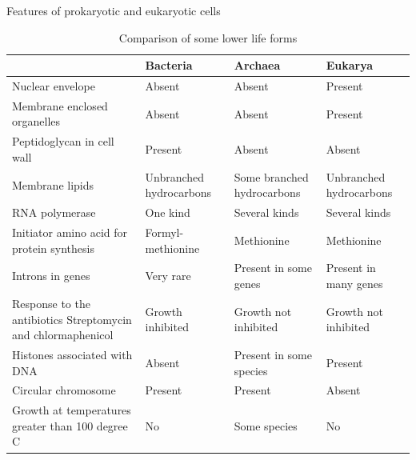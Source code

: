 \documentclass[ignorenonframetext,aspectratio=169]{beamer}
\begin{document}
\begin{frame}{Features of prokaryotic and eukaryotic cells}
\protect\hypertarget{features-of-prokaryotic-and-eukaryotic-cells-2}{}

\begin{table}[t]

\caption{\label{tab:eu-arch-prokaryotic-cell}Comparison of some lower life forms}
\centering
\fontsize{6}{8}\selectfont
\begin{tabular}{>{\raggedright\arraybackslash}p{15em}>{\raggedright\arraybackslash}p{15em}>{\raggedright\arraybackslash}p{15em}l}
\toprule
  & Bacteria & Archaea & Eukarya\\
\midrule
\rowcolor{gray!6}  Nuclear envelope & Absent & Absent & Present\\
Membrane enclosed organelles & Absent & Absent & Present\\
\rowcolor{gray!6}  Peptidoglycan in cell wall & Present & Absent & Absent\\
Membrane lipids & Unbranched hydrocarbons & Some branched hydrocarbons & Unbranched hydrocarbons\\
\rowcolor{gray!6}  RNA polymerase & One kind & Several kinds & Several kinds\\
\addlinespace
Initiator amino acid for protein synthesis & Formyl-methionine & Methionine & Methionine\\
\rowcolor{gray!6}  Introns in genes & Very rare & Present in some genes & Present in many genes\\
Response to the antibiotics Streptomycin and chlormaphenicol & Growth inhibited & Growth not inhibited & Growth not inhibited\\
\rowcolor{gray!6}  Histones associated with DNA & Absent & Present in some species & Present\\
Circular chromosome & Present & Present & Absent\\
\addlinespace
\rowcolor{gray!6}  Growth at temperatures greater than 100 degree C & No & Some species & No\\
\bottomrule
\end{tabular}
\end{table}

\end{frame}
\end{document}

